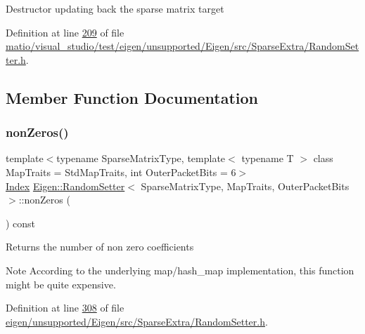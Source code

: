 Destructor updating back the sparse matrix target 

Definition at line \hyperlink{matio_2visual__studio_2test_2eigen_2unsupported_2_eigen_2src_2_sparse_extra_2_random_setter_8h_source_l00209}{209} of file \hyperlink{matio_2visual__studio_2test_2eigen_2unsupported_2_eigen_2src_2_sparse_extra_2_random_setter_8h_source}{matio/visual\+\_\+studio/test/eigen/unsupported/\+Eigen/src/\+Sparse\+Extra/\+Random\+Setter.\+h}.



\subsection{Member Function Documentation}
\mbox{\label{class_eigen_1_1_random_setter_ac34e5cd67e370641c3b48c8a91705046}} 
\subsubsection{\texorpdfstring{non\+Zeros()}{nonZeros()}\hspace{0.1cm}{\footnotesize\ttfamily [1/2]}}
{\footnotesize\ttfamily template$<$typename Sparse\+Matrix\+Type, template$<$ typename T $>$ class Map\+Traits = Std\+Map\+Traits, int Outer\+Packet\+Bits = 6$>$ \\
\hyperlink{namespace_eigen_a62e77e0933482dafde8fe197d9a2cfde}{Index} \hyperlink{class_eigen_1_1_random_setter}{Eigen\+::\+Random\+Setter}$<$ Sparse\+Matrix\+Type, Map\+Traits, Outer\+Packet\+Bits $>$\+::non\+Zeros (\begin{DoxyParamCaption}{ }\end{DoxyParamCaption}) const\hspace{0.3cm}{\ttfamily [inline]}}

\begin{DoxyReturn}{Returns}
the number of non zero coefficients
\end{DoxyReturn}
\begin{DoxyNote}{Note}
According to the underlying map/hash\+\_\+map implementation, this function might be quite expensive. 
\end{DoxyNote}


Definition at line \hyperlink{eigen_2unsupported_2_eigen_2src_2_sparse_extra_2_random_setter_8h_source_l00308}{308} of file \hyperlink{eigen_2unsupported_2_eigen_2src_2_sparse_extra_2_random_setter_8h_source}{eigen/unsupported/\+Eigen/src/\+Sparse\+Extra/\+Random\+Setter.\+h}.

